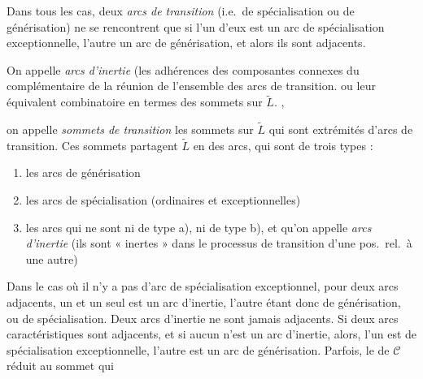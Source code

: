\documentclass[11pt,a4paper]{article}
\begin{document}
Dans tous les cas, \struck{\ill{}} deux \emph{arcs de transition} (i.e.\ de spécialisation ou de générisation)  \struck{\ill{} \ill{}} ne se rencontrent que si l'un d'eux est un arc de spécialisation exceptionnelle, l'autre un arc de générisation, et alors ils sont adjacents.

On appelle \emph{arcs d'inertie}  (les \struck{\ill{}} adhérences des composantes connexes du complémentaire de la réunion de l'ensemble des arcs de transition. ou leur équivalent combinatoire en termes des sommets sur $\widetilde{L}$. ,

 on appelle \emph{sommets de transition} les sommets sur $\widetilde{L}$ qui sont extrémités d'arcs de transition. Ces sommets partagent $\widetilde{L}$ en des arcs, qui sont de trois types :
\begin{enumerate}
\item[a)] les arcs de générisation
\item[b)] les arcs de spécialisation (ordinaires et exceptionnelles)
\item[c)] les  arcs qui ne sont ni de type a), ni de type b), et qu'on appelle \emph{arcs d'inertie} (ils sont « inertes » dans le processus de transition d'une pos.\ rel.\ à une autre)
\end{enumerate}

Dans le cas où il n'y a pas d'arc de spécialisation exceptionnel,  pour deux arcs  adjacents, \struck{\ill{}} un et un seul est un arc d'inertie, l'autre étant donc de générisation, ou de spécialisation. Deux arcs d'inertie ne sont jamais adjacents. Si deux arcs caractéristiques sont adjacents, \struck{\ill{}} et si aucun n'est un arc d'inertie, alors, \struck{\ill{}} \struck{\ill{} \ill{} \ill{}} l'un est de spécialisation exceptionnelle, l'autre est un arc de générisation. Parfois, le   de $\mathcal{C}$ réduit au sommet qui
\end{document}
